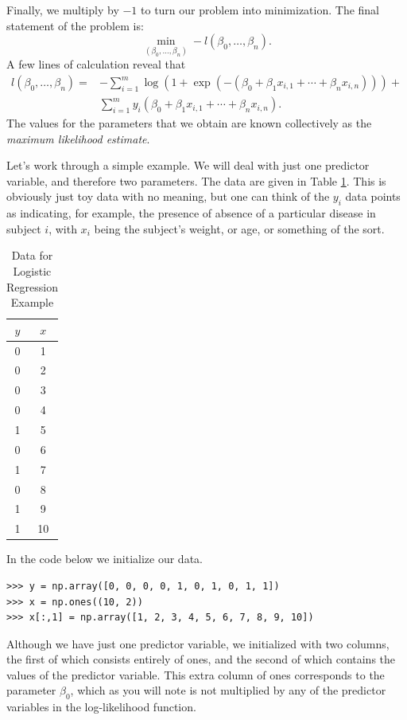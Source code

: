 Finally, we multiply by $-1$ to turn our problem into minimization. The final statement of the problem is:
\[
\min_{(\beta_0,\ldots,\beta_n)}-l(\beta_0, \ldots, \beta_n).
\]
A few lines of calculation reveal that
\begin{align*}
l(\beta_0,\ldots,\beta_n) = &-\sum_{i=1}^{m}\log(1+\exp(-(\beta_0 + \beta_1x_{i,1} + \cdots +\beta_nx_{i,n}))) +\\
 &\sum_{i=1}^m y_i(\beta_0 + \beta_1x_{i,1} + \cdots + \beta_nx_{i,n}).
\end{align*}
The values for the parameters that we obtain are known collectively as the \emph{maximum likelihood estimate}.

Let's work through a simple example. We will deal with just one predictor variable, and therefore two parameters.
The data are given in Table \ref{table:data}.
This is obviously just toy data with no meaning, but one can think of the $y_i$ data points as indicating, for example, the
presence of absence of a particular disease in subject $i$, with $x_i$ being the subject's weight, or age, or something
of the sort.

\begin{table}
  \caption{Data for Logistic Regression Example}
  \centering
  \begin{tabular}{c c}
    \hline\hline
    $y$ & $x$\\
    \hline
    0 & 1 \\
    0 & 2 \\
    0 & 3 \\
    0 & 4 \\
    1 & 5 \\
    0 & 6 \\
    1 & 7 \\
    0 & 8 \\
    1 & 9 \\
    1 & 10\\
    \hline
  \end{tabular}
  \label{table:data}
\end{table}

In the code below we initialize our data.
\begin{lstlisting}
>>> y = np.array([0, 0, 0, 0, 1, 0, 1, 0, 1, 1])
>>> x = np.ones((10, 2))
>>> x[:,1] = np.array([1, 2, 3, 4, 5, 6, 7, 8, 9, 10])
\end{lstlisting}
Although we have just one predictor variable, we initialized  with two columns,
the first of which consists entirely of ones, and the second of which contains the values of the
predictor variable. This extra column of ones corresponds to the parameter $\beta_0$, which as you
will note is not multiplied by any of the predictor variables in the log-likelihood function.

